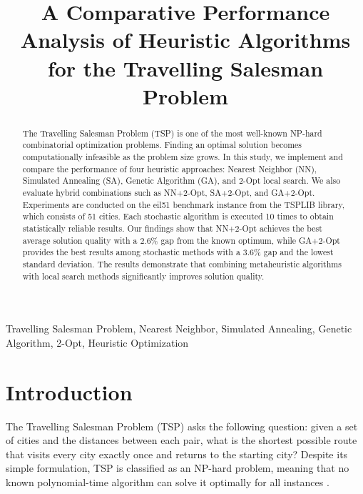 \documentclass[conference]{IEEEtran}
\begin{document}
\title{A Comparative Performance Analysis of Heuristic Algorithms for the Travelling Salesman Problem}

\author{
}

\maketitle

\begin{abstract}
The Travelling Salesman Problem (TSP) is one of the most well-known NP-hard combinatorial optimization problems. Finding an optimal solution becomes computationally infeasible as the problem size grows. In this study, we implement and compare the performance of four heuristic approaches: Nearest Neighbor (NN), Simulated Annealing (SA), Genetic Algorithm (GA), and 2-Opt local search. We also evaluate hybrid combinations such as NN+2-Opt, SA+2-Opt, and GA+2-Opt. Experiments are conducted on the eil51 benchmark instance from the TSPLIB library, which consists of 51 cities. Each stochastic algorithm is executed 10 times to obtain statistically reliable results. Our findings show that NN+2-Opt achieves the best average solution quality with a 2.6\% gap from the known optimum, while GA+2-Opt provides the best results among stochastic methods with a 3.6\% gap and the lowest standard deviation. The results demonstrate that combining metaheuristic algorithms with local search methods significantly improves solution quality.
\end{abstract}

\begin{IEEEkeywords}
Travelling Salesman Problem, Nearest Neighbor, Simulated Annealing, Genetic Algorithm, 2-Opt, Heuristic Optimization
\end{IEEEkeywords}

\section{Introduction}

The Travelling Salesman Problem (TSP) asks the following question: given a set of cities and the distances between each pair, what is the shortest possible route that visits every city exactly once and returns to the starting city? Despite its simple formulation, TSP is classified as an NP-hard problem, meaning that no known polynomial-time algorithm can solve it optimally for all instances \cite{garey1979}.
\end{document}

